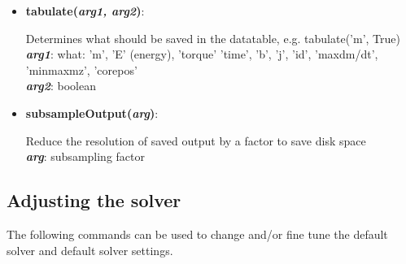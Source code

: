 \begin{itemize}
 \item {\vspace{-0.4cm}\textbf{tabulate(\textit{arg1, arg2})}:  
				\flushright\parbox{0.9 \textwidth}{\vspace{-0.25cm} 
				Determines what should be saved in the datatable, e.g. tabulate('m', True)\\
				\textbf{\textit{arg1}}: what: 'm', 'E' (energy), 'torque' 'time', 'b', 'j', 'id', 'maxdm/dt', 'minmaxmz', 'corepos'\\
				\textbf{\textit{arg2}}: boolean\\
				}\flushleft}

 \item {\vspace{-0.4cm}\textbf{subsampleOutput(\textit{arg})}:
				\flushright\parbox{0.9 \textwidth}{\vspace{-0.25cm} 
				Reduce the resolution of saved output by a factor to save disk space\\
				\textbf{\textit{arg}}: subsampling factor
				}\flushleft}

\end{itemize}


\subsection{Adjusting the solver}

The following commands can be used to change and/or fine tune the default solver and default solver settings.

